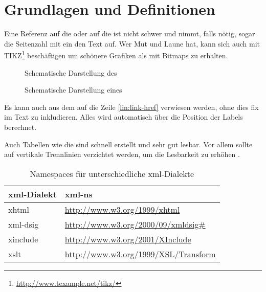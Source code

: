 
\chapter{Grundlagen und Definitionen}
\label{chap:GrundlagenDefinitionen}
\blindtext

Eine Referenz auf die  oder auf die  ist nicht schwer und nimmt, falls nötig, sogar die Seitenzahl mit ein den Text auf. Wer Mut und
Laune hat, kann sich auch mit TIKZ\footnote{\url{http://www.texample.net/tikz/}} beschäftigen um schönere Grafiken als mit Bitmaps zu erhalten.

\begin{figure}
\centering

\caption{Schematische Darstellung des }
\label{fig:wot}
\end{figure}

\begin{figure}
\centering

\caption{Schematische Darstellung eines }
\label{fig:ht}
\end{figure}

Es kann auch aus dem  auf die Zeile \ref{lin:link-href} verwiesen werden, ohne dies fix im Text zu inkludieren. Alles wird automatisch über die
Position der Labels berechnet.



Auch Tabellen wie die  sind schnell erstellt und sehr gut lesbar. Vor allem sollte auf vertikale Trennlinien verzichtet werden, um die
Lesbarkeit zu erhöhen \cite{latex}.

\begin{table}
    \centering
    \begin{tabularx}{\textwidth}{ l X }
        \gls{xml}-Dialekt  & \gls{xml-ns} \\
        \hline
        \hline
        \gls{xhtml} & \url{http://www.w3.org/1999/xhtml} \\
        \hline
        \gls{xml-dsig} & \url{http://www.w3.org/2000/09/xmldsig\#} \\
        \hline
        \gls{xinclude} & \url{http://www.w3.org/2001/XInclude} \\
        \hline
        \gls{xslt} & \url{http://www.w3.org/1999/XSL/Transform} \\
        \hline
    \end{tabularx}
    \caption{Namespaces für unterschiedliche \protect\gls{xml}-Dialekte}
    \label{tab:xml-namespaces}
\end{table}

